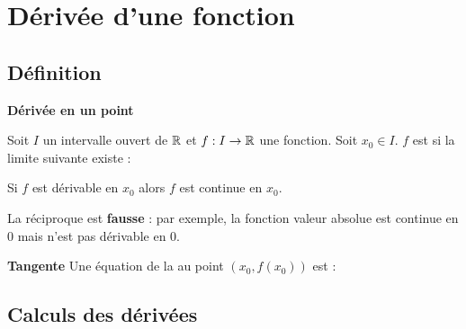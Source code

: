 \documentclass[10pt,class=article,crop=false]{standalone}
\begin{document}
	
\section{Dérivée d'une fonction}

\begin{multicols}{2}
	

\subsection{Définition}


\textbf{Dérivée en un point}

Soit $I$ un intervalle ouvert de $\mathbb{R}$ et $f : I \to \mathbb{R}$ une fonction. Soit $x_0 \in I$.
$f$ est  si la limite suivante existe :

\begin{proposition}
Si $f$ est dérivable en $x_0$ alors $f$ est continue en $x_0$.
\end{proposition}

La réciproque est \textbf{fausse} : par exemple, la fonction valeur absolue
est continue en $0$ mais n'est pas dérivable en $0$.


\textbf{Tangente}
Une équation de la  au point $(x_0,f(x_0))$ est :




\subsection{Calculs des dérivées}







\end{multicols}
\end{document}
